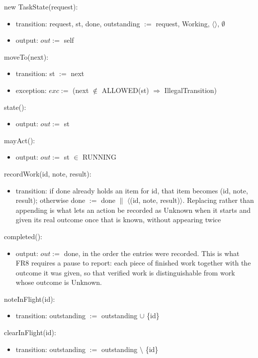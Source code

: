 \documentclass[12pt, titlepage]{article}
\begin{document}
\noindent new TaskState(request):
\begin{itemize}
\item transition: request, st, done, outstanding $:=$ request, Working,
$\langle\rangle$, $\emptyset$
\item output: $out :=$ self
\end{itemize}

\noindent moveTo(next):
\begin{itemize}
\item transition: st $:=$ next
\item exception: $exc :=$ (next $\notin$ ALLOWED(st) $\Rightarrow$
IllegalTransition)
\end{itemize}

\noindent state():
\begin{itemize}
\item output: $out :=$ st
\end{itemize}

\noindent mayAct():
\begin{itemize}
\item output: $out :=$ st $\in$ RUNNING
\end{itemize}

\noindent recordWork(id, note, result):
\begin{itemize}
\item transition: if done already holds an item for id, that item becomes (id,
note, result); otherwise done $:=$ done $\|$ $\langle$(id, note,
result)$\rangle$. Replacing rather than appending is what lets an action be
recorded as Unknown when it starts and given its real outcome once that is
known, without appearing twice
\end{itemize}

\noindent completed():
\begin{itemize}
\item output: $out :=$ done, in the order the entries were recorded. This is
what FR8 requires a pause to report: each piece of finished work together with
the outcome it was given, so that verified work is distinguishable from work
whose outcome is Unknown.
\end{itemize}

\noindent noteInFlight(id):
\begin{itemize}
\item transition: outstanding $:=$ outstanding $\cup$ \{id\}
\end{itemize}

\noindent clearInFlight(id):
\begin{itemize}
\item transition: outstanding $:=$ outstanding $\setminus$ \{id\}
\end{itemize}
\end{document}
